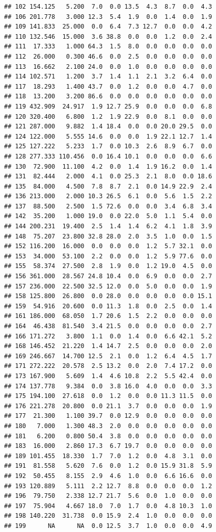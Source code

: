 \documentclass[]{report}
\begin{document}
\begin{verbatim}
## 102 154.125   5.200  7.0  0.0 13.5  4.3  8.7  0.0  4.3
## 106 201.778   3.000 12.3  5.4  1.9  0.0  1.4  0.0  1.9
## 109 141.833  25.000  0.0  6.4  7.3 12.7  0.0  0.0  4.2
## 110 132.546  15.000  3.6 38.8  0.0  0.0  1.2  0.0  2.4
## 111  17.333   1.000 64.3  1.5  8.0  0.0  0.0  0.0  0.0
## 112  26.000   0.300 46.6  0.0  2.5  0.0  0.0  0.0  0.0
## 113  16.662   2.100 24.0  0.0  1.0  0.0  0.0  0.0  0.0
## 114 102.571   1.200  3.7  1.4  1.1  2.1  3.2  6.4  0.0
## 117  18.293   1.400 43.7  0.0  1.2  0.0  0.0  4.7  0.0
## 118  13.200   3.200 86.6  0.0  0.0  0.0  0.0  0.0  0.0
## 119 432.909  24.917  1.9 12.7 25.9  0.0  0.0  0.0  6.8
## 120 320.400   6.800  1.2  1.9 22.9  0.0  8.1  0.0  0.0
## 121 287.000   9.882  1.4 18.4  0.0  0.0 20.0 29.5  0.0
## 124 122.000   5.555 14.6  0.0  0.0  1.9 22.1 12.7  1.4
## 125 127.222   5.233  1.7  0.0 10.3  2.6  8.9  6.7  0.0
## 128 277.333 110.456  0.0 16.4 10.1  0.0  0.0  0.0  6.6
## 130  72.900  11.100  4.2  0.0  1.4  1.9 16.2  0.0  1.4
## 131  82.444   2.000  4.1  0.0 25.3  2.1  8.0  0.0 18.6
## 135  84.000   4.500  7.8  8.7  2.1  0.0 14.9 22.9  2.4
## 136 213.000   2.000 10.3 26.5  6.1  0.0  5.6  1.5  2.2
## 137  88.500   2.500  1.5 72.6  0.0  0.0  3.4  6.8  3.4
## 142  35.200   1.000 19.0  0.0 22.0  5.0  1.1  5.4  0.0
## 144 200.231  19.400  2.5  1.4  1.4  6.2  4.1  1.8  3.9
## 148  75.207  23.800 32.8 28.0  2.0  3.5  1.0  0.0  1.5
## 152 116.200  16.000  0.0  0.0  0.0  1.2  5.7 32.1  0.0
## 153  34.000  53.100  2.2  0.0  0.0  1.2  5.9 77.6  0.0
## 155  58.374  27.500  2.8  1.9  0.0  1.2 19.0  4.5  0.0
## 156 361.000  28.567 24.8 10.4  0.0  6.9  0.0  0.0  2.7
## 157 236.000  22.500 32.5 12.0  0.0  5.0  0.0  0.0  1.9
## 158 125.800  26.800  0.0 28.0  0.0  0.0  0.0  0.0 15.1
## 159  54.916  20.600  0.0 11.3  1.8  0.0  2.5  0.0  1.4
## 161 186.000  68.050  1.7 20.6  1.5  2.2  0.0  0.0  0.0
## 164  46.438  81.540  3.4 21.5  0.0  0.0  0.0  0.0  2.7
## 166 171.272   3.800  1.1  0.0  1.4  0.0  6.6 42.1  5.2
## 168 146.452  21.220  1.4 14.7  2.5  0.0  0.0  0.0  2.0
## 169 246.667  14.700 12.5  2.1  0.0  1.2  6.4  4.5  1.7
## 171 272.222  20.578  2.5 13.2  0.0  2.0  7.4 17.2  0.0
## 173 167.900   5.609  1.4  4.6 10.8  2.2  5.5 42.4  0.0
## 174 137.778   9.384  0.0  3.8 16.0  4.0  0.0  0.0  3.3
## 175 194.100  27.618  0.0  1.2  0.0  0.0 11.3 11.5  0.0
## 176 221.278  20.800  0.0 21.1  3.7  0.0  0.0  0.0  1.9
## 177  21.300   1.100 39.7  0.0 12.9  0.0  0.0  0.0  0.0
## 180   7.000   1.300 48.3  2.0  0.0  0.0  0.0  0.0  0.0
## 181   6.200   0.800 50.4  3.8  0.0  0.0  0.0  0.0  0.0
## 183  16.000   2.860 17.3  6.7 19.7  0.0  0.0  0.0  0.0
## 189 101.455  18.330  1.7  7.0  1.2  0.0  4.8  3.1  0.0
## 191  81.558   5.620  7.6  0.0  1.2  0.0 15.9 31.8  5.9
## 192  50.455   8.155  2.9  4.6  1.0  0.0  6.6 16.6  0.0
## 193 120.889   5.111  2.2 12.7  8.8  0.0  0.0  0.0  1.2
## 196  79.750   2.338 12.7 21.7  5.6  0.0  1.0  0.0  0.0
## 197  75.904   4.667 18.0  7.0  1.7  0.0  4.8 10.3  1.0
## 198 140.220  31.738  0.0 15.9  2.4  1.0  0.0  0.0  0.0
## 199      NA      NA  0.0 12.5  3.7  1.0  0.0  0.0  4.9
\end{verbatim}
\end{document}
